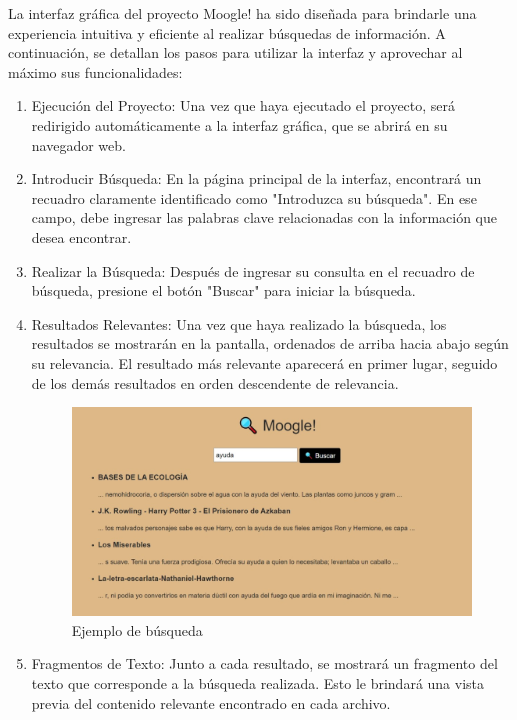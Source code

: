 \documentclass[a4paper, 12pt]{article}
\begin{document}
La interfaz gráfica del proyecto Moogle! ha sido diseñada para brindarle una experiencia intuitiva y eficiente al realizar búsquedas de información. A continuación, se detallan los pasos para utilizar la interfaz y aprovechar al máximo sus funcionalidades:
\begin{enumerate}
\item Ejecución del Proyecto:
   Una vez que haya ejecutado el proyecto, será redirigido automáticamente a la interfaz gráfica, que se abrirá en su navegador web.

\item Introducir Búsqueda:
   En la página principal de la interfaz, encontrará un recuadro claramente identificado como "Introduzca su búsqueda". En ese campo, debe ingresar las palabras clave relacionadas con la información que desea encontrar.


\item Realizar la Búsqueda:
   Después de ingresar su consulta en el recuadro de búsqueda, presione el botón "Buscar" para iniciar la búsqueda.

\item Resultados Relevantes:
   Una vez que haya realizado la búsqueda, los resultados se mostrarán en la pantalla, ordenados de arriba hacia abajo según su relevancia. El resultado más relevante aparecerá en primer lugar, seguido de los demás resultados en orden descendente de relevancia. 
\begin{figure}[h]
       \center
       \includegraphics[width=14cm]{Web1.jpg}
       \caption{Ejemplo de búsqueda}
       \label{fig:example}
\end{figure}

\item Fragmentos de Texto:
   Junto a cada resultado, se mostrará un fragmento del texto que corresponde a la búsqueda realizada. Esto le brindará una vista previa del contenido relevante encontrado en cada archivo.


\end{enumerate}
\end{document}
